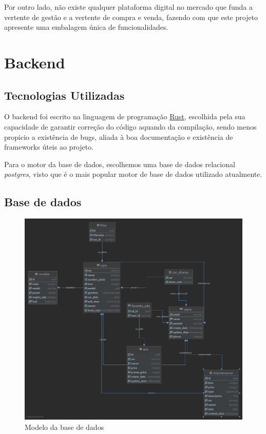\documentclass[a4paper]{report}
\begin{document}
Por outro lado, não existe qualquer plataforma digital no mercado que funda a vertente de gestão
e a vertente de compra e venda, fazendo com que este projeto apresente uma embalagem única de
funcionalidades.

\chapter{Backend}

\section{Tecnologias Utilizadas}

O backend foi escrito na linguagem de programação \href{http://rust-lang.org}{Rust}, escolhida
pela sua capacidade de garantir correção do código aquando da compilação, sendo menos propicio
a existência de bugs, aliada à boa documentação e existência de frameworks úteis ao projeto.

Para o motor da base de dados, escolhemos uma base de dados relacional \textit{postgres}, visto
que é o mais popular motor de base de dados utilizado atualmente.

\section{Base de dados}

\begin{figure}[H]
    \centering
    \includegraphics[width=\textwidth]{images/database.png}
    \caption{Modelo da base de dados}
\end{figure}
\end{document}
